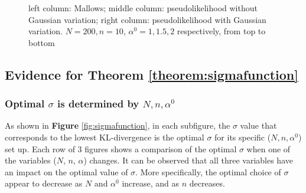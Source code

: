 \documentclass[11pt, oneside]{article}   	%
\begin{document}
\begin{figure}[h!]
{\begin{minipage}[t]{.3\textwidth}
	\end{minipage} 
	
}

	
\caption{left column: Mallows; middle column: pseudolikelihood without Gaussian variation; right column: pseudolikelihood with Gaussian variation. $N = 200, n = 10$, $\alpha^0 = 1, 1.5, 2$ respectively, from top to bottom}
\label{fig:heatPlot_comparison}
\end{figure}
\subsection{Evidence for Theorem \ref{theorem:sigmafunction}}

\subsubsection{Optimal $\sigma$ is determined by $N, n, \alpha^0$}
As shown in \textbf{Figure} \ref{fig:sigmafunction}, in each subfigure, the $\sigma$ value that corresponds to the lowest KL-divergence is the optimal $\sigma$ for its specific ($N, n, \alpha^0$) set up. Each row of 3 figures shows a comparison of the optimal $\sigma$ when one of the variables ($N$, $n$, $\alpha$) changes. It can be observed that all three variables have an impact on the optimal value of $\sigma$. More specifically, the optimal choice of $\sigma$ appear to decrease as $N$ and $\alpha^0$ increase, and as $n$ decreases.
\end{document}
